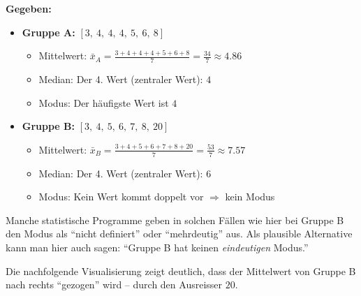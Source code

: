 \begin{aufgabe}{1}
\textbf{Gegeben:}

\begin{itemize}
  \item \textbf{Gruppe A:} $[3,\ 4,\ 4,\ 4,\ 5,\ 6,\ 8]$
  \begin{itemize}
    \item Mittelwert: $\bar{x}_A = \frac{3 + 4 + 4 + 4 + 5 + 6 + 8}{7} = \frac{34}{7} \approx 4.86$
    \item Median: Der 4. Wert (zentraler Wert): $4$
    \item Modus: Der häufigste Wert ist $4$
  \end{itemize}
  \item \textbf{Gruppe B:} $[3,\ 4,\ 5,\ 6,\ 7,\ 8,\ 20]$
  \begin{itemize}
  \item Mittelwert: $\bar{x}_B = \frac{3 + 4 + 5 + 6 + 7 + 8 + 20}{7} = \frac{53}{7} \approx 7.57$
  \item Median: Der 4. Wert (zentraler Wert): $6$
  \item Modus: Kein Wert kommt doppelt vor $\Rightarrow$ kein Modus
\end{itemize}
\end{itemize}

Manche statistische Programme geben in solchen Fällen wie hier bei Gruppe B den Modus als ``nicht definiert'' oder ``mehrdeutig'' aus. Als plausible Alternative kann man hier auch sagen: ``Gruppe B hat keinen \textit{eindeutigen} Modus.''

Die nachfolgende Visualisierung zeigt deutlich, dass der Mittelwert von Gruppe B nach rechts ``gezogen'' wird – durch den Ausreisser $20$.

\begin{figure}[H]
\centering
{}
\end{figure}
\end{aufgabe}
